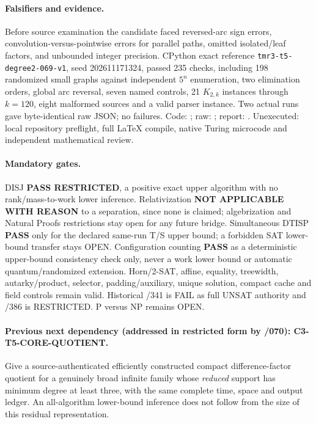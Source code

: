 \documentclass[11pt]{article}
\begin{document}
\paragraph{Falsifiers and evidence.}
Before source examination the candidate faced reversed-arc
sign errors, convolution-versus-pointwise errors for parallel
paths, omitted isolated/leaf factors, and unbounded integer
precision. CPython exact reference
\texttt{tmr3-t5-degree2-069-v1}, seed 202611171324,
passed 235 checks, including 198 randomized small graphs
against independent $5^n$ enumeration, two elimination orders,
global arc reversal, seven named controls, 21
$K_{2,k}$ instances through $k=120$, eight malformed sources
and a valid parser instance. Two actual runs gave byte-identical
raw JSON; no failures. Code:
;
raw:
;
report:
.
Unexecuted: local repository preflight, full LaTeX compile,
native Turing microcode and independent mathematical review.

\paragraph{Mandatory gates.}
DISJ \textbf{PASS RESTRICTED}, a positive exact upper
algorithm with no rank/mass-to-work lower inference.
Relativization \textbf{NOT APPLICABLE WITH REASON} to a
separation, since none is claimed; algebrization and
Natural Proofs restrictions stay open for any future bridge.
Simultaneous DTISP \textbf{PASS} only for the declared
same-run T/S upper bound; a forbidden SAT lower-bound
transfer stays OPEN. Configuration counting \textbf{PASS}
as a deterministic upper-bound consistency check only,
never a work lower bound or automatic quantum/randomized
extension. Horn/2-SAT, affine, equality, treewidth,
autarky/product, selector, padding/auxiliary, unique
solution, compact cache and field controls remain valid.
Historical /341 is FAIL as full UNSAT authority and /386
is RESTRICTED. P versus NP remains OPEN.

\paragraph{Previous next dependency (addressed in restricted form by /070): C3-T5-CORE-QUOTIENT.}
Give a source-authenticated efficiently constructed compact
difference-factor quotient for a genuinely broad infinite
family whose \emph{reduced} support has minimum degree at
least three, with the same complete time, space and output
ledger. An all-algorithm lower-bound inference does not
follow from the size of this residual representation.
\end{document}
